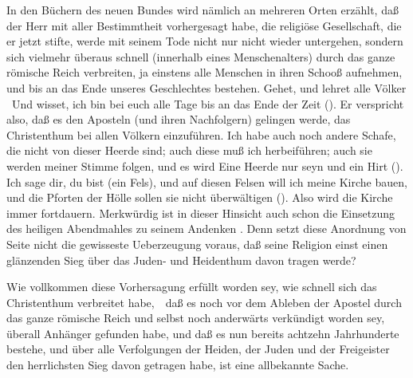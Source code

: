\begin{aufza}
\item In den Büchern des neuen Bundes wird nämlich an mehreren Orten erzählt, daß der Herr  mit aller Bestimmtheit vorhergesagt habe, die religiöse Gesellschaft, die er jetzt stifte, werde mit seinem Tode nicht nur nicht wieder untergehen, sondern sich vielmehr überaus schnell (innerhalb eines Menschenalters) durch das ganze römische Reich verbreiten, ja einstens alle Menschen in ihren Schooß aufnehmen, und bis an das Ende unseres Geschlechtes bestehen. Gehet, und lehret alle Völker \usw\ Und wisset, ich bin bei euch alle Tage bis an das Ende der Zeit (). Er verspricht also, daß es den Aposteln (und ihren Nachfolgern) gelingen werde, das Christenthum bei allen Völkern einzuführen. Ich habe auch noch andere Schafe, die nicht von dieser Heerde sind; auch diese muß ich herbeiführen; auch sie werden meiner Stimme folgen, und es wird Eine Heerde nur seyn und ein Hirt (). Ich sage dir, du bist  (ein Fels), und auf diesen Felsen will ich meine Kirche bauen, und die Pforten der Hölle sollen sie nicht überwältigen (). Also wird die Kirche immer fortdauern. Merkwürdig ist in dieser Hinsicht auch schon die Einsetzung des heiligen Abendmahles zu seinem Andenken . Denn setzt diese Anordnung von  Seite nicht die gewisseste Ueberzeugung voraus, daß seine Religion einst einen glänzenden Sieg über das Juden- und Heidenthum davon tragen werde?
\item Wie vollkommen diese Vorhersagung  erfüllt worden sey, wie schnell sich das Christenthum verbreitet habe,~\ daß es noch vor dem Ableben der Apostel durch das ganze römische Reich und selbst noch anderwärts verkündigt worden sey, überall Anhänger gefunden habe, und daß es nun bereits achtzehn Jahrhunderte bestehe, und über alle Verfolgungen der Heiden, der Juden und der Freigeister den herrlichsten Sieg davon getragen habe, ist eine allbekannte Sache.

\end{aufza}

